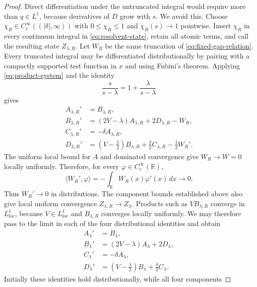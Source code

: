\documentclass[11pt]{amsart}
\numberwithin{equation}{section}
\theoremstyle{remark}
\newcommand{\R}{\mathbb R}
\begin{document}
\begin{proof}
Direct differentiation under the untruncated integral would require more
than $q\in L^1$, because derivatives of $D$ grow with $s$.  We avoid this.
Choose $\chi_R\in C_c^\infty((|\delta|,\infty))$ with
$0\le\chi_R\le1$ and $\chi_R(s)\to1$ pointwise.  Insert $\chi_R$ in every
continuum integral in \eqref{eq:resolvent-state}, retain all atomic terms, and
call the resulting state $Z_{\lambda,R}$.  Let $W_R$ be the same truncation of
\eqref{eq:fixed-gap-relation}.  Every truncated integral may be
differentiated distributionally by pairing with a compactly supported test
function in $x$ and using Fubini's theorem.  Applying
\eqref{eq:product-system} and the identity
\[
 \frac{s}{s-\lambda}=1+\frac{\lambda}{s-\lambda}
\]
gives
\begin{align}
 A_{\lambda,R}'
 &=B_{\lambda,R},
 \label{eq:cutoff-system-1}\\
 B_{\lambda,R}'
 &=(2V-\lambda)A_{\lambda,R}+2D_{\lambda,R}-W_R,
 \label{eq:cutoff-system-2}\\
 C_{\lambda,R}'
 &=-\delta A_{\lambda,R},
 \label{eq:cutoff-system-3}\\
 D_{\lambda,R}'
 &=\left(V-\frac{\lambda}{2}\right)B_{\lambda,R}
   +\frac{\delta}{2}C_{\lambda,R}-\frac12W_R'.
 \label{eq:cutoff-system-4}
\end{align}
The uniform local bound for $A$ and dominated convergence give
$W_R\to W=0$ locally uniformly.  Therefore, for every
$\varphi\in C_c^\infty(\R)$,
\[
 \langle W_R',\varphi\rangle
 =-\int_\R W_R(x)\varphi'(x)\,dx\longrightarrow0.
\]
Thus $W_R'\to0$ in distributions.  The component bounds established above
also give local uniform convergence $Z_{\lambda,R}\to Z_\lambda$.  Products
such as $V B_{\lambda,R}$ converge in $L^1_{\mathrm{loc}}$, because
$V\in L^1_{\mathrm{loc}}$ and $B_{\lambda,R}$ converges locally uniformly.
We may therefore pass to the limit in each of the four distributional
identities and obtain
\begin{equation}
 \boxed{
 \begin{aligned}
 A_\lambda'&=B_\lambda,\\
 B_\lambda'&=(2V-\lambda)A_\lambda+2D_\lambda,\\
 C_\lambda'&=-\delta A_\lambda,\\
 D_\lambda'&=\left(V-\frac{\lambda}{2}\right)B_\lambda
              +\frac{\delta}{2}C_\lambda.
 \end{aligned}}
 \label{eq:lambda-product-system}
\end{equation}
Initially these identities hold distributionally, while all four components

\end{proof}
\end{document}
